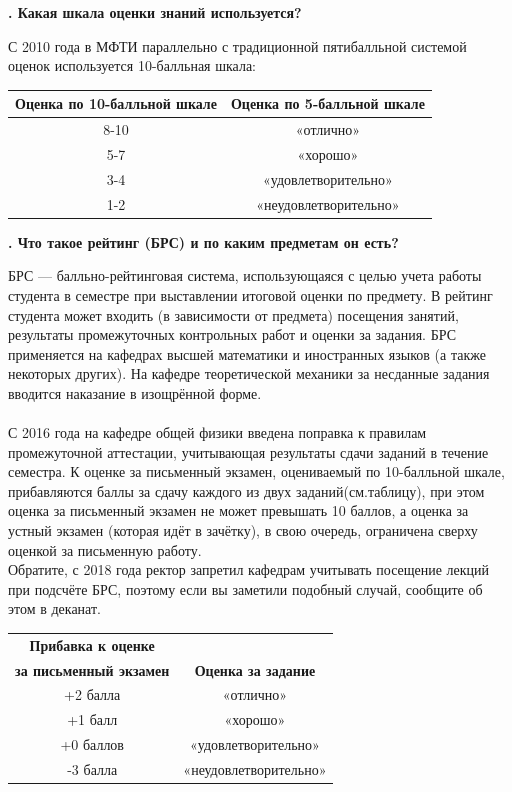 \documentclass[14pt]{extarticle}
\newcounter{question}
\newcommand\Que[1]{%
    \begin{minipage}{\textwidth}
    \leavevmode\par
    \stepcounter{question}
    \noindent
    {\large\textbf{\thequestion. #1}}\par}
\newcommand\Partans[2][]{%
    \leavevmode\par\noindent
    {\leftskip37pt
    \textbf{#1}#2\par}}
\begin{document}
\Que{Какая шкала оценки знаний используется?}
\Partans{С 2010 года в МФТИ параллельно с традиционной пятибалльной системой оценок используется 10-балльная шкала:}
\begin{center}
\begin{tabular}{ |c|c| }
\hline
    \textbf{Оценка по 10-балльной шкале} & \textbf{Оценка по 5-балльной шкале} \\ \hline
    8-10 & «отлично» \\ \hline
    5-7 & «хорошо» \\ \hline
    3-4 & «удовлетворительно» \\ \hline
    1-2 & «неудовлетворительно» \\
\hline
\end{tabular}
\end{center}
\end{minipage}

\Que{Что такое рейтинг (БРС) и по каким предметам он есть?}
\Partans{БРС — балльно-рейтинговая система, использующаяся с целью учета работы студента в семестре при выставлении итоговой оценки по предмету. В рейтинг студента может входить (в зависимости от предмета) посещения занятий, результаты промежуточных контрольных работ и оценки за задания. БРС применяется на кафедрах высшей математики и иностранных языков (а также некоторых других). На кафедре теоретической механики за несданные задания вводится наказание в изощрённой форме. \\ \\ С 2016 года на кафедре общей физики введена поправка к правилам промежуточной аттестации, учитывающая результаты сдачи заданий в течение семестра. К оценке за письменный экзамен, оцениваемый по 10-балльной шкале, прибавляются баллы за сдачу каждого из двух заданий(см.таблицу), при этом оценка за письменный экзамен не может превышать 10 баллов, а оценка за устный экзамен (которая идёт в зачётку), в свою очередь, ограничена сверху оценкой за письменную работу. \\ Обратите, с 2018 года ректор запретил кафедрам учитывать посещение лекций при подсчёте БРС, поэтому если вы заметили подобный случай, сообщите об этом в деканат. }

\begin{center}
\begin{tabular}{ |c|c| }
\hline
    \textbf{Прибавка к оценке} & \\
    \textbf{за письменный экзамен} & \textbf{Оценка за задание} \\ \hline
    +2 балла & «отлично» \\ \hline
    +1 балл & «хорошо» \\ \hline
    +0 баллов & «удовлетворительно» \\ \hline
    -3 балла & «неудовлетворительно» \\
\hline
\end{tabular}
\end{center}
\end{minipage}
\end{document}
